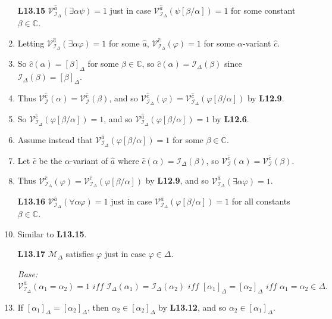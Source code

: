 \documentclass[a4paper, 11pt]{article} %
\newcommand{\I}{\mathcal{I}}
\newcommand{\M}{\mathcal{M}}
\newcommand{\C}{\mathbb{C}}
\newcommand{\VV}[2]{\mathcal{V}_{#1}^{#2}} %
\newcommand{\va}[1]{\hat{#1}} %
\newcommand{\qt}[2]{#1 #2} %
\newcommand{\unisub}[2]{[#1/#2]}
\def\metaA{\ensuremath{\varphi}}
\def\metaB{\ensuremath{\psi}}
\begin{document}
\begin{enumerate}
  \item[\bf L13.15] $\VV{\I_\Delta}{\va{a}}(\qt{\exists}{\alpha}\metaB)=1$ just in case $\VV{\I_\Delta}{\va{a}}(\metaB\unisub{\beta}{\alpha})=1$ for some constant $\beta\in\C$.
  \item Letting $\VV{\I_\Delta}{\va{a}}(\qt{\exists}{\alpha}\metaA)=1$ for some $\va{a}$, $\VV{\I_\Delta}{\va{c}}(\metaA)=1$ for some $\alpha$-variant $\va{c}$.
  \item So $\va{c}(\alpha)=[\beta]_\Delta$ for some $\beta\in\C$, so $\va{c}(\alpha)=\I_\Delta(\beta)$ since $\I_\Delta(\beta)=[\beta]_\Delta$.
  \item Thus $\VV{\I}{\va{c}}(\alpha)=\VV{\I}{\va{c}}(\beta)$, and so $\VV{\I_\Delta}{\va{c}}(\metaA)=\VV{\I_\Delta}{\va{c}}(\metaA\unisub{\beta}{\alpha})$ by \textbf{L12.9}.
  \item So $\VV{\I_\Delta}{\va{c}}(\metaA\unisub{\beta}{\alpha})=1$, and so $\VV{\I_\Delta}{\va{a}}(\metaA\unisub{\beta}{\alpha})=1$ by \textbf{L12.6}.
  \item Assume instead that $\VV{\I_\Delta}{\va{a}}(\metaA\unisub{\beta}{\alpha})=1$ for some $\beta\in\C$.
  \item Let $\va{c}$ be the $\alpha$-variant of $\va{a}$ where $\va{c}(\alpha)=\I_\Delta(\beta)$, so $\VV{\I}{\va{c}}(\alpha)=\VV{\I}{\va{c}}(\beta)$.
  \item Thus $\VV{\I_\Delta}{\va{c}}(\metaA)=\VV{\I_\Delta}{\va{c}}(\metaA\unisub{\beta}{\alpha})$ by \textbf{L12.9}, and so $\VV{\I_\Delta}{\va{a}}(\qt{\exists}{\alpha}\metaA)=1$.
  \item[\bf L13.16] $\VV{\I_\Delta}{\va{a}}(\qt{\forall}{\alpha}\metaA)=1$ just in case $\VV{\I_\Delta}{\va{a}}(\metaA\unisub{\beta}{\alpha})=1$ for all constants $\beta\in\C$.
    \setcounter{enumi}{0}
  \item Similar to \textbf{L13.15}.
  \item[\bf L13.17] $\M_\Delta$ satisfies $\metaA$ just in case $\metaA\in\Delta$.
    \setcounter{enumi}{0}
  \item[\it Base:] 
    $\VV{\I_\Delta}{\va{a}}(\alpha_1=\alpha_2)=1
      \textit{ iff } \I_\Delta(\alpha_1)=\I_\Delta(\alpha_2)
      \textit{ iff } [\alpha_1]_\Delta=[\alpha_2]_\Delta
      \textit{ iff } \alpha_1=\alpha_2\in\Delta.$
  \item If $[\alpha_1]_\Delta=[\alpha_2]_\Delta$, then $\alpha_2\in[\alpha_2]_\Delta$ by \textbf{L13.12}, and so $\alpha_2\in[\alpha_1]_\Delta$.

\end{enumerate}
\end{document}
